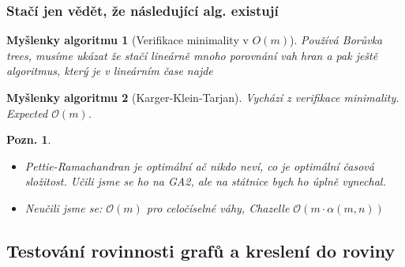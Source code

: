 \documentclass{article}
\theoremstyle{noparens}
\theoremstyle{noparens-mys}
\newtheorem*{alg-mys}{Myšlenky algoritmu}
\theoremstyle{noparens-note}
\newtheorem*{note}{Pozn.}
\newcommand{\OO}{\mathcal{O}}
\begin{document}
\subsubsection*{Stačí jen vědět, že následující alg. existují}

\begin{alg-mys}[Verifikace minimality v $O(m)$]
    Používá Borůvka trees, musíme ukázat že stačí lineárně mnoho porovnání vah
    hran a pak ještě algoritmus, který je v lineárním čase najde
\end{alg-mys}

\begin{alg-mys}[Karger-Klein-Tarjan]
    Vychází z verifikace minimality. Expected $\OO(m)$.
\end{alg-mys}

\begin{note}
    ~

    \begin{itemize}
        \item Pettie-Ramachandran je optimální ač nikdo neví, \emph{co} je
            optimální časová složitost. Učili jsme se ho na GA2, ale na
            státnice bych ho úplně vynechal.
        \item Neučili jsme se: $\OO(m)$ pro celočíselné váhy, Chazelle $\OO(m
            \cdot \alpha(m, n))$
    \end{itemize}
\end{note}


\subsection{Testování rovinnosti grafů a kreslení do roviny}
\end{document}
